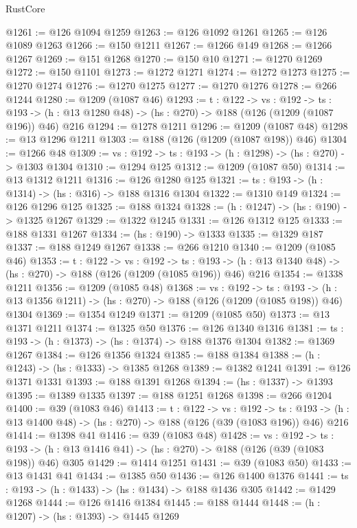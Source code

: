 \begin{lexlean}{RustCore}
\begin{coremodule}
@1261 := @126 @1094 @1259
@1263 := @126 @1092 @1261
@1265 := @126 @1089 @1263
@1266 := @150 @1211
@1267 := @1266 @149
@1268 := @1266 @1267
@1269 := @151 @1268
@1270 := @150 @10
@1271 := @1270 @1269
@1272 := @150 @1101
@1273 := @1272 @1271
@1274 := @1272 @1273
@1275 := @1270 @1274
@1276 := @1270 @1275
@1277 := @1270 @1276
@1278 := @266 @1244
@1280 := @1209 (@1087 @46)
@1293 := {t : @122} ->
  {vs : @192} ->
  {ts : @193} -> (h : @13 @1280 @48) -> (hs : @270) -> @188 (@126 (@1209 (@1087 @196)) @46) @216
@1294 := @1278 @1211
@1296 := @1209 (@1087 @48)
@1298 := @13 @1296 @1211
@1303 := @188 (@126 (@1209 (@1087 @198)) @46)
@1304 := @1266 @48
@1309 := {vs : @192} -> {ts : @193} -> (h : @1298) -> (hs : @270) -> @1303 @1304
@1310 := @1294 @125
@1312 := @1209 (@1087 @50)
@1314 := @13 @1312 @1211
@1316 := @126 @1280 @125
@1321 := {ts : @193} -> (h : @1314) -> (hs : @316) -> @188 @1316 @1304
@1322 := @1310 @149
@1324 := @126 @1296 @125
@1325 := @188 @1324
@1328 := (h : @1247) -> (hs : @190) -> @1325 @1267
@1329 := @1322 @1245
@1331 := @126 @1312 @125
@1333 := @188 @1331 @1267
@1334 := (hs : @190) -> @1333
@1335 := @1329 @187
@1337 := @188 @1249 @1267
@1338 := @266 @1210
@1340 := @1209 (@1085 @46)
@1353 := {t : @122} ->
  {vs : @192} ->
  {ts : @193} -> (h : @13 @1340 @48) -> (hs : @270) -> @188 (@126 (@1209 (@1085 @196)) @46) @216
@1354 := @1338 @1211
@1356 := @1209 (@1085 @48)
@1368 := {vs : @192} ->
  {ts : @193} -> (h : @13 @1356 @1211) -> (hs : @270) -> @188 (@126 (@1209 (@1085 @198)) @46) @1304
@1369 := @1354 @1249
@1371 := @1209 (@1085 @50)
@1373 := @13 @1371 @1211
@1374 := @1325 @50
@1376 := @126 @1340 @1316
@1381 := {ts : @193} -> (h : @1373) -> (hs : @1374) -> @188 @1376 @1304
@1382 := @1369 @1267
@1384 := @126 @1356 @1324
@1385 := @188 @1384
@1388 := (h : @1243) -> (hs : @1333) -> @1385 @1268
@1389 := @1382 @1241
@1391 := @126 @1371 @1331
@1393 := @188 @1391 @1268
@1394 := (hs : @1337) -> @1393
@1395 := @1389 @1335
@1397 := @188 @1251 @1268
@1398 := @266 @1204
@1400 := @39 (@1083 @46)
@1413 := {t : @122} ->
  {vs : @192} ->
  {ts : @193} -> (h : @13 @1400 @48) -> (hs : @270) -> @188 (@126 (@39 (@1083 @196)) @46) @216
@1414 := @1398 @41
@1416 := @39 (@1083 @48)
@1428 := {vs : @192} ->
  {ts : @193} -> (h : @13 @1416 @41) -> (hs : @270) -> @188 (@126 (@39 (@1083 @198)) @46) @305
@1429 := @1414 @1251
@1431 := @39 (@1083 @50)
@1433 := @13 @1431 @41
@1434 := @1385 @50
@1436 := @126 @1400 @1376
@1441 := {ts : @193} -> (h : @1433) -> (hs : @1434) -> @188 @1436 @305
@1442 := @1429 @1268
@1444 := @126 @1416 @1384
@1445 := @188 @1444
@1448 := (h : @1207) -> (hs : @1393) -> @1445 @1269

\end{coremodule}
\end{lexlean}
